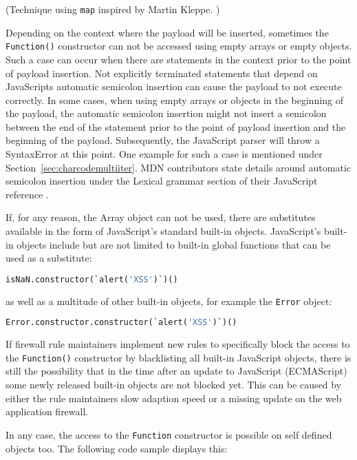(Technique using \verb|map| inspired by Martin Kleppe. \cite{mk/elementsVid})

Depending on the context where the payload will be inserted, sometimes the \verb|Function()| constructor can not be accessed using empty arrays or empty objects. Such a case can occur when there are statements in the context prior to the point of payload insertion. Not explicitly terminated statements that depend on JavaScripts automatic semicolon insertion can cause the payload to not execute correctly. In some cases, when using empty arrays or objects in the beginning of the payload, the automatic semicolon insertion might not insert a semicolon between the end of the statement prior to the point of payload insertion and the beginning of the payload. Subsequently, the JavaScript parser will throw a SyntaxError at this point. One example for such a case is mentioned under Section~\ref{sec:charcodemultiiter}. MDN contributors state details around automatic semicolon insertion under the Lexical grammar section of their JavaScript reference \cite{js/autosemi}.

If, for any reason, the Array object can not be used, there are substitutes available in the form of JavaScript's standard built-in objects.
JavaScript's built-in objects include but are not limited to built-in global functions that can be used as a substitute: \cite{js/builtin}

\begin{lstlisting}[style=basicStyle,language=Python,escapeinside=\^\^]
isNaN.constructor(`alert('XSS')`)()
\end{lstlisting}

as well as a multitude of other built-in objects, for example the \verb|Error| object:

\begin{lstlisting}[style=basicStyle,language=Python,escapeinside=\^\^]
Error.constructor.constructor(`alert('XSS')`)()
\end{lstlisting}

If firewall rule maintainers implement new rules to specifically block the access to the \verb|Function()| constructor by blacklisting all built-in JavaScript objects, there is still the possibility that in the time after an update to JavaScript (ECMAScript) some newly released built-in objects are not blocked yet. This can be caused by either the rule maintainers slow adaption speed or a missing update on the web application firewall.

In any case, the access to the \verb|Function| constructor is possible on self defined objects too. The following code sample displays this:

